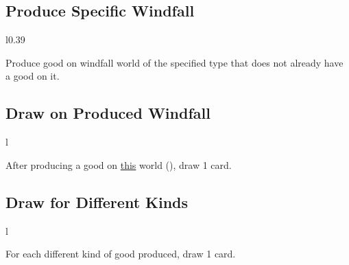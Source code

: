 \documentclass[letterpaper,landscape,twocolumn,8pt]{extarticle}
\newcommand{\inline}[1]{\scalerel*{#1}{M}}
\begin{document}
\begin{minipage}[t]{\calc{1/3}\columnwidth}
\setlength{\intextsep}{0pt}%


\subsection*{\RaggedRight{}Produce Specific Windfall}
\begin{wrapfigure}{l}{0.39\columnwidth}
    
    
    \newline{}
    
    
\end{wrapfigure}

Produce good on windfall world of the specified type that does not already have
a good on it.
\subsection*{\RaggedRight{}Draw on Produced Windfall}

\begin{wrapfigure}{l}{\columnwidth}
    
\end{wrapfigure}

After producing a good on \underline{this} world
\mbox{(\inline{})}, draw 1
card.

\hfill{}
\subsection*{\RaggedRight{}Draw for Different Kinds}

\begin{wrapfigure}{l}{\columnwidth}
    
\end{wrapfigure}

For each different kind of good produced, draw 1 card.

\end{minipage}

\end{document}
